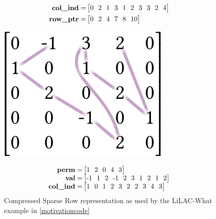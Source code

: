 \begin{figure}[p]
\begin{minipage}[b]{0.65\linewidth}
\begin{align*}
\text{\bf col\_ind} =& \begin{bmatrix}
0\ \ 2\ \ 1\ \ 3\ \ 1\ \ 2\ \ 3\ \ 3\ \ 2\ \ 4\\
\end{bmatrix}\\
\text{\bf row\_ptr} =& \begin{bmatrix}
0\ \ 2\ \ 4\ \ 7\ \ 8\ \ 10\\
\end{bmatrix}
\end{align*}
\end{minipage}
\caption{Compressed Sparse Row representation as used by the LiLAC-What example
         in \autoref{motivationcode}}
\label{csr_lilacwhat_fig}
\vspace{1.5em}
\centering
\begin{minipage}[b]{0.3\linewidth}
\includegraphics[width=0.9\linewidth]{figures/jdsorder.png}
\vspace{0.04em}
\end{minipage}
\begin{minipage}[b]{0.65\linewidth}
\footnotesize
\begin{align*}
\text{\bf perm} =& \begin{bmatrix}1\ \ 2\ \ 0\ \ 4\ \ 3\\\end{bmatrix}\\[-0.4em]
\text{\bf val} =& \begin{bmatrix}\text{-}1\ \ 1\ \ 2\ \ \text{-}1\ \ 2\ \ 3\ \ 1\ \ 2\ \ 1\ \ 2\\\end{bmatrix}\\[-0.4em]
\text{\bf col\_ind} =& \begin{bmatrix}1\ \ 0\ \ 1\ \ 2\ \ 3\ \ 2\ \ 2\ \ 3\ \ 4\ \ 3\\\end{bmatrix}\\[-0.4em]

\end{align*}
\end{minipage}
\end{figure}
